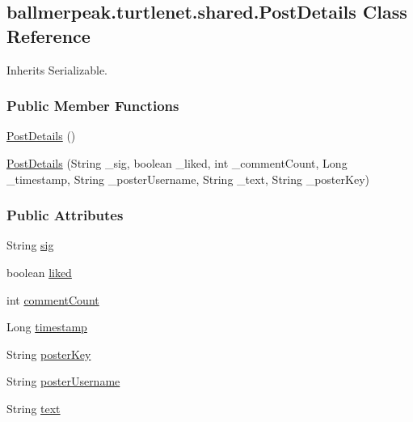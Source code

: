 \hypertarget{classballmerpeak_1_1turtlenet_1_1shared_1_1PostDetails}{\subsection{ballmerpeak.\-turtlenet.\-shared.\-Post\-Details Class Reference}
\label{classballmerpeak_1_1turtlenet_1_1shared_1_1PostDetails}
}


Inherits Serializable.

\subsubsection*{Public Member Functions}
\begin{DoxyCompactItemize}
\item 
\hyperlink{classballmerpeak_1_1turtlenet_1_1shared_1_1PostDetails_ac805c8c68de597a5ff5696d1d253b5a7}{Post\-Details} ()
\item 
\hyperlink{classballmerpeak_1_1turtlenet_1_1shared_1_1PostDetails_a1f3b272444d0abfc4e4fc374c2a0c833}{Post\-Details} (String \-\_\-sig, boolean \-\_\-liked, int \-\_\-comment\-Count, Long \-\_\-timestamp, String \-\_\-poster\-Username, String \-\_\-text, String \-\_\-poster\-Key)
\end{DoxyCompactItemize}
\subsubsection*{Public Attributes}
\begin{DoxyCompactItemize}
\item 
String \hyperlink{classballmerpeak_1_1turtlenet_1_1shared_1_1PostDetails_ac6f606b33cca7c5be0e3eb908241bf8e}{sig}
\item 
boolean \hyperlink{classballmerpeak_1_1turtlenet_1_1shared_1_1PostDetails_aea0cbf8b30b582800479e28eeb1e931f}{liked}
\item 
int \hyperlink{classballmerpeak_1_1turtlenet_1_1shared_1_1PostDetails_a24553cdb518e4501cbdf63263c21d1a0}{comment\-Count}
\item 
Long \hyperlink{classballmerpeak_1_1turtlenet_1_1shared_1_1PostDetails_a0602043b91650f4eec3d4b71175b7362}{timestamp}
\item 
String \hyperlink{classballmerpeak_1_1turtlenet_1_1shared_1_1PostDetails_a01a466200c299cca8b1cefabb10973d7}{poster\-Key}
\item 
String \hyperlink{classballmerpeak_1_1turtlenet_1_1shared_1_1PostDetails_a15dfe34395623678a63f569dc9339cbd}{poster\-Username}
\item 
String \hyperlink{classballmerpeak_1_1turtlenet_1_1shared_1_1PostDetails_a28dbe8ca59c66a80b1d0538f5485314d}{text}
\end{DoxyCompactItemize}


